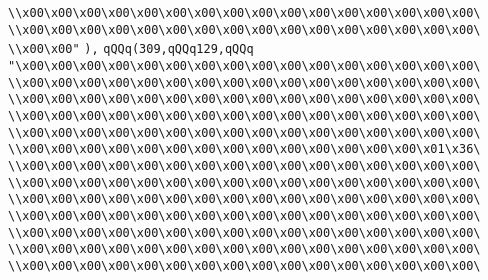 \verb|\\x00\x00\x00\x00\x00\x00\x00\x00\x00\x00\x00\x00\x00\x00\x00\x00\|\newline
\verb|\\x00\x00\x00\x00\x00\x00\x00\x00\x00\x00\x00\x00\x00\x00\x00\x00\|\newline
\verb|\\x00\x00"|\newline
\verb|),|\newline
\verb|qQQq(309,qQQq129,qQQq|\newline
\verb|"\x00\x00\x00\x00\x00\x00\x00\x00\x00\x00\x00\x00\x00\x00\x00\x00\|\newline
\verb|\\x00\x00\x00\x00\x00\x00\x00\x00\x00\x00\x00\x00\x00\x00\x00\x00\|\newline
\verb|\\x00\x00\x00\x00\x00\x00\x00\x00\x00\x00\x00\x00\x00\x00\x00\x00\|\newline
\verb|\\x00\x00\x00\x00\x00\x00\x00\x00\x00\x00\x00\x00\x00\x00\x00\x00\|\newline
\verb|\\x00\x00\x00\x00\x00\x00\x00\x00\x00\x00\x00\x00\x00\x00\x00\x00\|\newline
\verb|\\x00\x00\x00\x00\x00\x00\x00\x00\x00\x00\x00\x00\x00\x00\x01\x36\|\newline
\verb|\\x00\x00\x00\x00\x00\x00\x00\x00\x00\x00\x00\x00\x00\x00\x00\x00\|\newline
\verb|\\x00\x00\x00\x00\x00\x00\x00\x00\x00\x00\x00\x00\x00\x00\x00\x00\|\newline
\verb|\\x00\x00\x00\x00\x00\x00\x00\x00\x00\x00\x00\x00\x00\x00\x00\x00\|\newline
\verb|\\x00\x00\x00\x00\x00\x00\x00\x00\x00\x00\x00\x00\x00\x00\x00\x00\|\newline
\verb|\\x00\x00\x00\x00\x00\x00\x00\x00\x00\x00\x00\x00\x00\x00\x00\x00\|\newline
\verb|\\x00\x00\x00\x00\x00\x00\x00\x00\x00\x00\x00\x00\x00\x00\x00\x00\|\newline
\verb|\\x00\x00\x00\x00\x00\x00\x00\x00\x00\x00\x00\x00\x00\x00\x00\x00\|\newline
